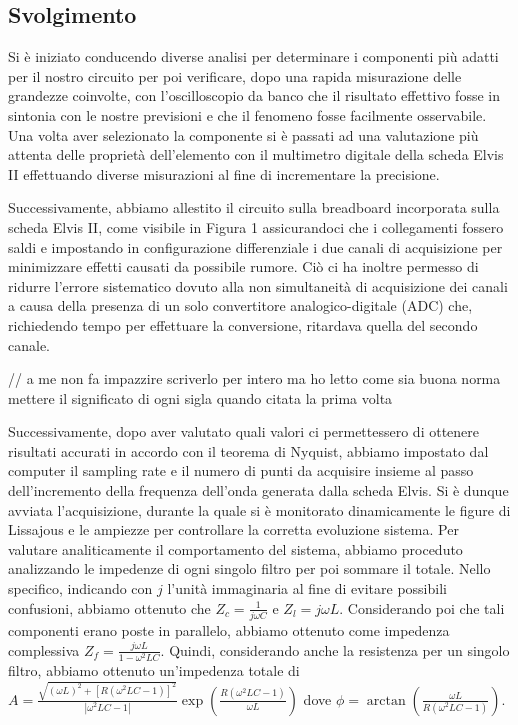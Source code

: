 \documentclass[12pt, letterpaper]{article}
\begin{document}
\subsection{Svolgimento}
Si è iniziato conducendo diverse analisi per determinare i componenti più adatti per il nostro circuito per poi verificare, dopo una rapida misurazione delle grandezze coinvolte, con l’oscilloscopio da banco che il risultato effettivo fosse in sintonia con le nostre previsioni e che il fenomeno fosse facilmente osservabile. Una volta aver selezionato la componente si è passati ad una valutazione più attenta delle proprietà dell’elemento con il multimetro digitale della scheda Elvis II effettuando diverse misurazioni al fine di incrementare la precisione. 

Successivamente, abbiamo allestito il circuito sulla breadboard incorporata sulla scheda Elvis II, come visibile in Figura 1 assicurandoci che i collegamenti fossero saldi e impostando in configurazione differenziale i due canali di acquisizione per minimizzare effetti causati da possibile rumore. Ciò ci ha inoltre permesso di ridurre l'errore sistematico dovuto alla non simultaneità di acquisizione dei canali a causa della presenza di un solo convertitore analogico-digitale (ADC) che, richiedendo tempo per effettuare la conversione, ritardava quella del secondo canale.

 // a me non fa impazzire scriverlo per intero ma ho letto come sia buona norma mettere il significato di ogni sigla quando citata la prima volta

Successivamente, dopo aver valutato quali valori ci permettessero di ottenere risultati accurati in accordo con il teorema di Nyquist, abbiamo impostato dal computer il sampling rate e il numero di punti da acquisire insieme al passo dell’incremento della frequenza dell'onda generata dalla scheda Elvis. Si è dunque avviata l'acquisizione, durante la quale si è monitorato dinamicamente le figure di Lissajous e le ampiezze per controllare la corretta evoluzione sistema.
Per valutare analiticamente il comportamento del sistema, abbiamo proceduto analizzando le impedenze di ogni singolo filtro per poi sommare il totale. Nello specifico, indicando con $j$ l'unità immaginaria al fine di evitare possibili confusioni, abbiamo ottenuto che $Z_c = \frac{1}{j \omega C}$ e $Z_l = j \omega L$. Considerando poi che tali componenti erano poste in parallelo, abbiamo ottenuto come impedenza complessiva $Z_f= \frac{j\omega L}{1 - \omega^2 LC}$. Quindi, considerando anche la resistenza per un singolo filtro, abbiamo ottenuto un'impedenza totale di
$A= \frac{\sqrt{(\omega L)^2 + [R(\omega^2 LC -1)]^2}}{|\omega^2 LC -1|} \exp\left(\frac{R(\omega^2 LC -1)}{\omega L}\right) $
dove $\phi = \arctan\left(\frac{\omega L}{R(\omega^2 LC -1)}\right)$.
\end{document}

